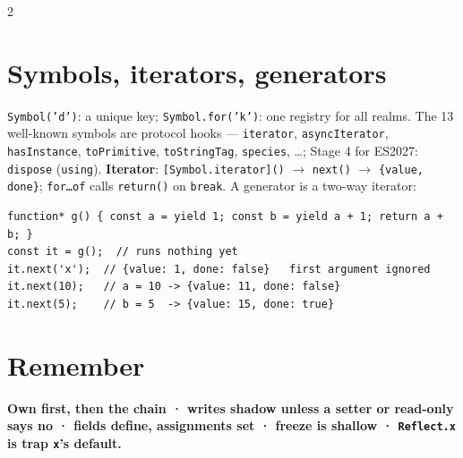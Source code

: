 \documentclass[8pt]{extarticle}
\newcommand\ct[1]{\texttt{#1}}
\begin{document}
\begin{multicols}{2}
\section{Symbols, iterators, generators}
\ct{Symbol('d')}: a unique key; \ct{Symbol.for('k')}: one registry for all realms. The 13
well-known symbols are protocol hooks — \ct{iterator}, \ct{asyncIterator}, \ct{hasInstance},
\ct{toPrimitive}, \ct{toStringTag}, \ct{species}, \ldots; Stage 4 for ES2027: \ct{dispose}
(\ct{using}).
\textbf{Iterator}: \ct{[Symbol.iterator]()} $\to$ \ct{next()} $\to$ \ct{\{value, done\}};
\ct{for\ldots of} calls \ct{return()} on \ct{break}. A generator is a two-way iterator:
\begin{lstlisting}[style=js]
function* g() { const a = yield 1; const b = yield a + 1; return a + b; }
const it = g();  // runs nothing yet
it.next('x');  // {value: 1, done: false}   first argument ignored
it.next(10);   // a = 10 -> {value: 11, done: false}
it.next(5);    // b = 5  -> {value: 15, done: true}
\end{lstlisting}

\section{Remember}
\textbf{Own first, then the chain · writes shadow unless a setter or read-only says no · fields
define, assignments set · freeze is shallow · \ct{Reflect.x} is trap \ct{x}'s default.}

\end{multicols}

\end{document}
